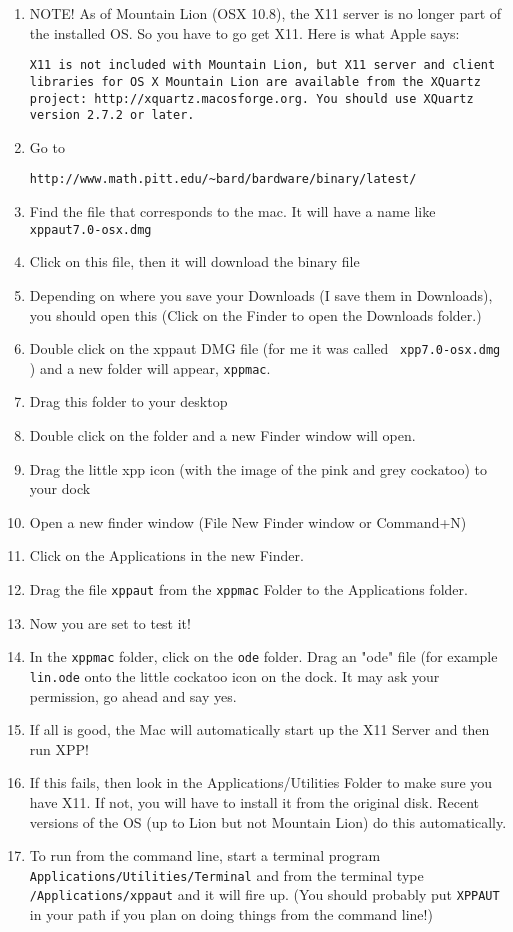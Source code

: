 \documentclass{article}
\begin{document}
\begin{enumerate}
\item NOTE! As of Mountain Lion (OSX 10.8), the X11 server is no longer part of the installed OS. So you have to go get X11. Here is what Apple says: 
\begin{verbatim}
X11 is not included with Mountain Lion, but X11 server and client libraries for OS X Mountain Lion are available from the XQuartz project: http://xquartz.macosforge.org. You should use XQuartz version 2.7.2 or later. 
\end{verbatim}
\item  Go to 
\begin{verbatim}
http://www.math.pitt.edu/~bard/bardware/binary/latest/
\end{verbatim}
\item Find the file that corresponds to the mac. It will have a name
like {\tt xppaut7.0-osx.dmg}
\item Click on this file, then it will download the binary file  
\item Depending on where you save your Downloads (I save them in
Downloads), you should open this (Click on the Finder to open the
Downloads folder.) 
\item Double click on the xppaut DMG file (for me  it was called {\tt
xpp7.0-osx.dmg} ) and a new folder will appear, {\tt xppmac}. 
\item  Drag this folder to your desktop
\item Double click on the folder and a new Finder window will open. 
\item Drag the little xpp icon (with the image of the pink and grey
cockatoo) to your dock
\item Open a new finder window (File New Finder window or Command+N)
\item Click on the Applications in the new Finder.
\item Drag the file {\tt xppaut} from the {\tt xppmac} Folder to the
Applications folder.
\item Now you are set to test it!
\item In the {\tt xppmac} folder, click on the {\tt ode} folder. Drag
an "ode" file (for example {\tt lin.ode} onto the little cockatoo icon
on the dock. It may ask your permission, go ahead and say yes.
\item If all is good, the Mac will automatically start up the X11
Server and then run XPP!
\item If this fails, then look in the Applications/Utilities Folder to
make sure you have X11. If not, you will have to install it from the
original disk. Recent versions of the OS (up to Lion but not Mountain Lion)  do this automatically.
\item To run from the command line, start a terminal program {\tt
Applications/Utilities/Terminal} and from the terminal type {\tt
/Applications/xppaut} and it will fire up. (You should probably put {\tt XPPAUT} in your path if you plan on doing things from the command line!)
\end{enumerate}
\end{document}
